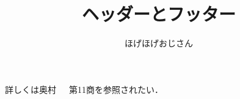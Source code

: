 \documentclass[a4paper, 11pt, uplatex]{jsarticle}
\begin{document}
\title{ヘッダーとフッター}
\author{ほげほげおじさん}
\maketitle





詳しくは奥村~\cite{微分書}　第11商を参照されたい．



\nocite{*}

\end{document}
